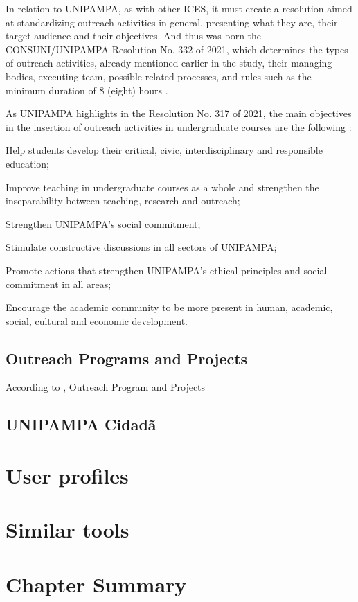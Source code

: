 In relation to \ac{UNIPAMPA}, as with other \ac{ICES}, it must create a resolution aimed at standardizing outreach activities in general, presenting what they are, their target audience and their objectives. And thus was born the CONSUNI/UNIPAMPA Resolution No. 332 of 2021, which determines the types of outreach activities, already mentioned earlier in the study, their managing bodies, executing team, possible related processes, and rules such as the minimum duration of 8 (eight) hours \cite{Resolucao-332:2021}.

As \ac{UNIPAMPA} highlights in the Resolution No. 317 of 2021, the main objectives in the insertion of outreach activities in undergraduate courses are the following \cite{res317}:
\begin{inparaenum}[(i)]
    \item Help students develop their critical, civic, interdisciplinary and responsible education;
    \item Improve teaching in undergraduate courses as a whole and strengthen the inseparability between teaching, research and outreach;
    \item Strengthen \ac{UNIPAMPA}'s social commitment;
    \item Stimulate constructive discussions in all sectors of \ac{UNIPAMPA};
    \item Promote actions that strengthen \ac{UNIPAMPA}'s ethical principles and social commitment in all areas;
    \item Encourage the academic community to be more present in human, academic, social, cultural and economic development.
\end{inparaenum}

\subsection{Outreach Programs and Projects}\label{sec:bac-3}

According to , Outreach Program and Projects

\subsection{UNIPAMPA Cidadã}\label{sec:bac-4}

\section{User profiles}\label{sec:bac-5}

\section{Similar tools}\label{sec:bac-6}

\section{Chapter Summary}\label{sec:bac-7}